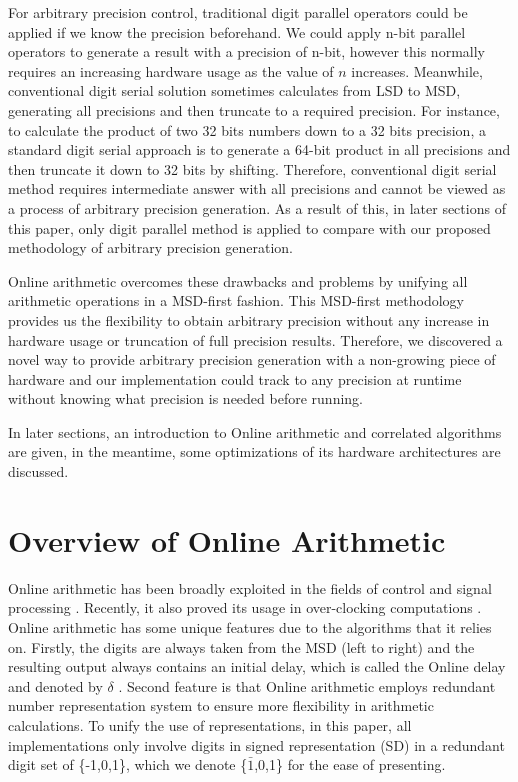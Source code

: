 \documentclass{sig-alternate}
\begin{document}
	For arbitrary precision control, traditional digit parallel operators could be applied if we know the precision beforehand. We could apply n-bit parallel operators to generate a result with a precision of n-bit, however this normally requires an increasing hardware usage as the value of $n$ increases. Meanwhile, conventional digit serial solution sometimes calculates from LSD to MSD, generating all precisions and then truncate to a required precision. For instance, to calculate the product of two 32 bits numbers down to a 32 bits precision, a standard digit serial approach is to generate a 64-bit product in all precisions and then truncate it down to 32 bits by shifting. Therefore, conventional digit serial method requires intermediate answer with all precisions and cannot be viewed as a process of arbitrary precision generation. As a result of this, in later sections of this paper, only digit parallel method is applied to compare with our proposed methodology of arbitrary precision generation. 
	
	Online arithmetic overcomes these drawbacks and problems by unifying all arithmetic operations in a MSD-first fashion. This MSD-first methodology provides us the flexibility to obtain arbitrary precision without any increase in hardware usage or truncation of full precision results. 
	Therefore, we discovered a novel way to provide arbitrary precision generation with a non-growing piece of hardware and our implementation could track to any precision at runtime without knowing what precision is needed before running.   
	
	In later sections, an introduction to Online arithmetic and correlated algorithms are given, in the meantime, some optimizations of its hardware architectures are discussed.
		
	\section{Overview of Online Arithmetic}
	Online arithmetic has been broadly exploited in the fields of control and signal processing \cite{online_control}\cite{online_signal_processing}. Recently, it also proved its usage in over-clocking computations \cite{Kan_overclocking}. Online arithmetic has some unique features due to the algorithms that it relies on. Firstly, the digits are always taken from the MSD (left to right) and the resulting output always contains an initial delay, which is called the Online delay and denoted by $\delta$ \cite{digital_arithmetic_book}. Second feature is that Online arithmetic employs redundant number representation system to ensure more flexibility in arithmetic calculations. To unify the use of representations, in this paper, all implementations only involve digits in signed representation (SD) in a redundant digit set of \{-1,0,1\}, which we denote \{$\bar{1}$,0,1\} for the ease of presenting. 
	
\end{document}
